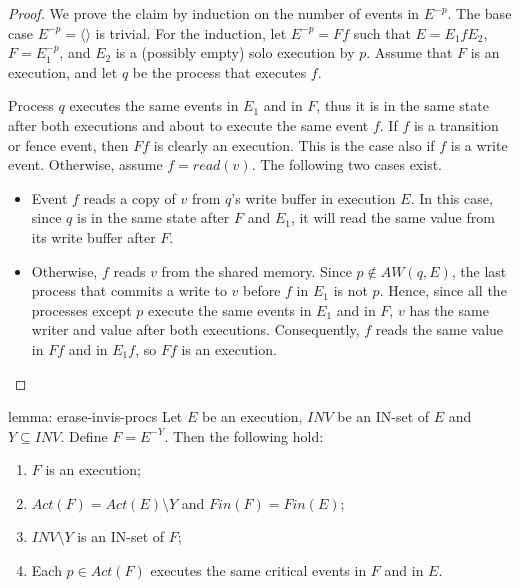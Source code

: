 \begin{proof}
	We prove the claim by induction on the number of events in $E^{-p}$. The base case $E^{-p} = \langle \rangle$ is trivial. For the induction, let $E^{-p} = F f$ such that $E = E_1 f E_2$, $F = E_1^{-p}$, and $E_2$ is a (possibly empty) solo execution by $p$. Assume that $F$ is an execution, and let $q$ be the process that executes $f$.
	
	Process $q$ executes the same events in $E_1$ and in $F$, thus it is in the same state after both executions and about to execute the same event $f$. If $f$ is a transition or fence event, then $Ff$ is clearly an execution. This is the case also if $f$ is a write event. Otherwise, assume $f = read(v)$. The following two cases exist.
\begin{itemize}
\item Event $f$ reads a copy of $v$ from $q$'s write buffer in execution $E$. In this case, since $q$ is in the same state after $F$ and $E_1$, it will read the same value from its write buffer after $F$.
\item Otherwise, $f$ reads $v$ from the shared memory. Since $p \notin AW(q,E)$, the last process that commits a write to $v$ before $f$ in $E_1$ is not $p$. Hence, since all the processes except $p$ execute the same events in $E_1$ and in $F$, $v$ has the same writer and value after both executions. Consequently, $f$ reads the same value in $Ff$ and in $E_1 f$, so $Ff$ is an execution.
\end{itemize}
\end{proof}





\begin{lemma-repeat} {lemma: erase-invis-procs}
	Let $E$ be an execution, $\mathit{INV}$ be an IN-set of $E$ and $Y \subseteq \mathit{INV}$.
	\newline Define $F = E^{-Y}$. Then the following hold:
	\begin{enumerate}
		\item $F$ is an execution;
		\item $Act(F) = Act(E) \setminus Y$ and $Fin(F) = Fin(E)$;
		\item $\mathit{INV} \setminus Y$ is an IN-set of $F$;
		\item Each $p \in Act(F)$ executes the same critical events in $F$ and in $E$.
	\end{enumerate}
\end{lemma-repeat}


